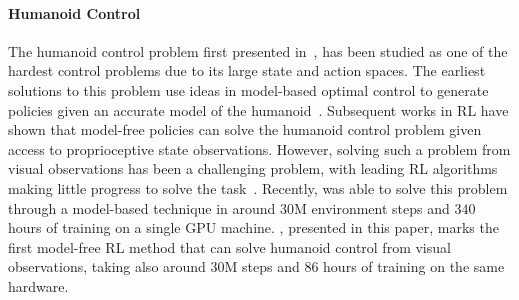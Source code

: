 \paragraph{Humanoid Control}  The humanoid control problem first presented in~\cite{tassa2012trajopt}, has been studied as one of the hardest control problems due to its large state and action spaces. The earliest solutions to this problem use ideas in model-based optimal control to generate policies given an accurate model of the humanoid~\cite{}. Subsequent works in RL have shown that model-free policies can solve the humanoid control problem given access to proprioceptive state observations. However, solving such a problem from visual observations has been a challenging problem, with leading RL algorithms making little progress to solve the task~\citep{tassa2018dmcontrol}. Recently, \cite{hafner2020dreamerv2} was able to solve this problem through a model-based technique in around 30M environment steps and $340$ hours of training on a single GPU machine. \drqs{}, presented in this paper, marks the first model-free RL method that can solve humanoid control from visual observations, taking also around 30M steps and $86$ hours of training on the same hardware.


